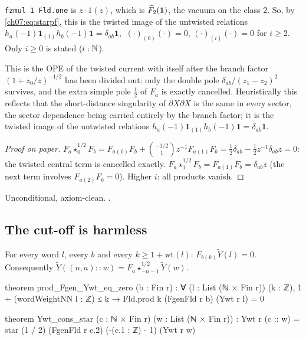 \begin{dictionary}
\verb|fzmul 1 Fld.one| is $z\cdot1(z)$, which is $\widetilde{F}_2(\mathbf 1)$, the vacuum on the
class $2$. So, by \eqref{ch07:eq:starpf}, this is the twisted image of the untwisted relations
$h_a(-1)\mathbf 1_{(1)}h_b(-1)\mathbf 1 = \delta_{ab}\mathbf 1$, $\ (\cdot)_{(0)}(\cdot) = 0$,
$(\cdot)_{(i)}(\cdot)=0$ for $i\ge2$. Only $i\ge0$ is stated ($i:{\mathbb{N}}$).
\end{dictionary}

\begin{physics}
This is the OPE of the twisted current with itself after the branch factor $(1+z_0/z)^{-1/2}$ has been divided out: only the double pole $\delta_{ab}/(z_1-z_2)^2$ survives, and the extra simple pole $\tfrac12$ of $F_a$ is exactly cancelled. Heuristically this reflects that the short-distance singularity of $\partial X\partial X$ is the same in every sector, the sector dependence being carried entirely by the branch factor; it is the twisted image of the untwisted relations $h_a(-1)\mathbf 1_{(1)}h_b(-1)\mathbf 1=\delta_{ab}\mathbf 1$.
\end{physics}

\begin{proof}[Proof on paper]
$F_a\star^{1/2}_0F_b = F_{a(0)}F_b + \binom{-1/2}{1}z^{-1}F_{a(1)}F_b = \frac12\delta_{ab} -
\frac12z^{-1}\delta_{ab}z = 0$: the twisted central term is cancelled exactly.
$F_a\star^{1/2}_1F_b = F_{a(1)}F_b = \delta_{ab}z$ (the next term involves $F_{a(2)}F_b = 0$).
Higher $i$: all products vanish.
\end{proof}

\begin{status}
Unconditional, axiom-clean. .
\end{status}

\subsection{The cut-off is harmless}

\begin{proposition}\label{ch07:prop:cutoff}
For every word $l$, every $b$ and every $k\ge1+\mathrm{wt}(l)$: $F_{b(k)}\widetilde Y(l) = 0$.
Consequently $\widetilde Y((n,a)::w) = F_a\star^{1/2}_{-n-1}\widetilde Y(w)$.
\end{proposition}

\begin{leancode}
theorem prod_Fgen_Ywt_eq_zero (b : Fin r) :
    ∀ (l : List (ℕ × Fin r)) (k : ℤ), 1 + (wordWeightNN l : ℤ) ≤ k →
      Fld.prod k (FgenFld r b) (Ywt r l) = 0

theorem Ywt_cons_star (c : ℕ × Fin r) (w : List (ℕ × Fin r)) :
    Ywt r (c :: w) = star (1 / 2) (FgenFld r c.2) (-(c.1 : ℤ) - 1) (Ywt r w)
\end{leancode}

